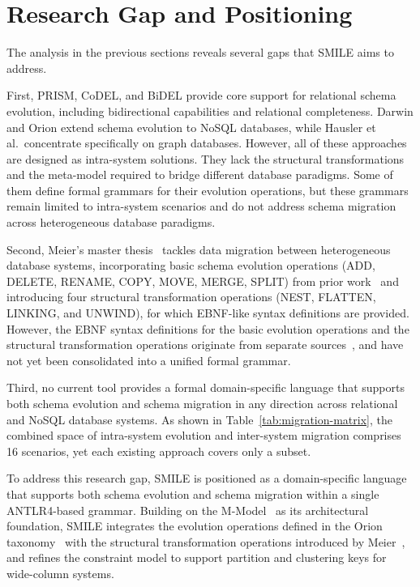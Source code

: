 %
%


\section{Research Gap and Positioning}
\label{sec:stateoftheart:gap}

The analysis in the previous sections reveals several gaps that SMILE  aims to address.

First, PRISM, CoDEL, and BiDEL provide core support for relational schema evolution, including bidirectional capabilities and relational completeness. Darwin and Orion extend schema evolution to NoSQL databases, while Hausler et al.\ concentrate specifically on graph databases. However, all of these approaches are designed as intra-system solutions. They lack the structural transformations and the meta-model required to bridge different database paradigms. Some of them define formal grammars for their evolution operations, but these grammars remain limited to intra-system scenarios and do not address schema migration across heterogeneous database paradigms.

Second, Meier's master thesis~\cite{meier2023datenmigration} tackles data migration between heterogeneous database systems, incorporating basic
schema evolution operations (ADD, DELETE, RENAME, COPY, MOVE, MERGE, SPLIT) from prior work~\cite{scherzinger2013managing, holubova2019evolution}
and introducing four structural transformation operations (NEST, FLATTEN, LINKING, and UNWIND), for which EBNF-like syntax definitions are          provided. However, the EBNF syntax definitions for the basic evolution operations and the structural transformation operations originate from separate sources~\cite{scherzinger2013managing, holubova2019evolution}, and have not yet been consolidated into a
unified formal grammar.


Third, no current tool provides a formal domain-specific language that supports both schema evolution and schema migration in any direction across relational and NoSQL database systems. As shown in Table~\ref{tab:migration-matrix}, the combined space of intra-system evolution and inter-system migration comprises 16 scenarios, yet each existing approach covers only a subset.

To address this research gap, SMILE  is positioned as a domain-specific language that supports both schema evolution and schema migration within a single ANTLR4-based grammar. Building on the M-Model~\cite{conrad2022metamodels} as its architectural foundation, SMILE  integrates the evolution operations defined in the Orion taxonomy~\cite{chillon2022taxonomy} with the structural transformation operations introduced by Meier~\cite{meier2023datenmigration}, and refines the constraint model to support partition and clustering keys for wide-column systems.

